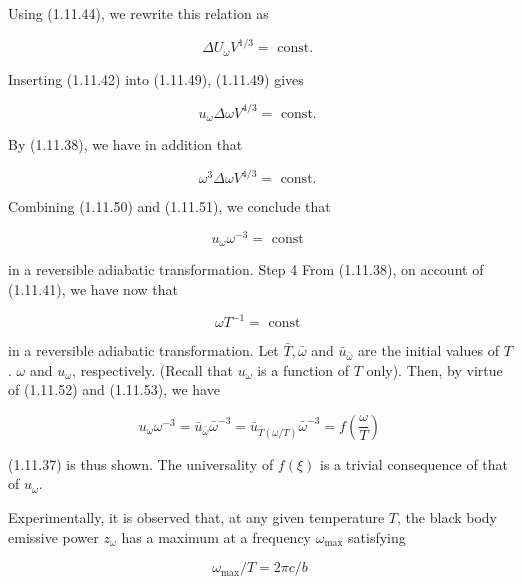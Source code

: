 \documentclass{article}
\begin{document}
Using (1.11.44), we rewrite this relation as
 
\begin{equation*}
\Delta U_{\omega} V^{1 / 3}=\text { const. } \tag{1.11.49}
\end{equation*}
 

Inserting (1.11.42) into (1.11.49), (1.11.49) gives
 
\begin{equation*}
u_{\omega} \Delta \omega V^{4 / 3}=\text { const. } \tag{1.11.50}
\end{equation*}
 

By (1.11.38), we have in addition that
 
\begin{equation*}
\omega^{3} \Delta \omega V^{4 / 3}=\text { const. } \tag{1.11.51}
\end{equation*}
 

Combining (1.11.50) and (1.11.51), we conclude that
 
\begin{equation*}
u_{\omega} \omega^{-3}=\text { const } \tag{1.11.52}
\end{equation*}
 
in a reversible adiabatic transformation.
Step 4 From (1.11.38), on account of (1.11.41), we have now that
 
\begin{equation*}
\omega T^{-1}=\text { const } \tag{1.11.53}
\end{equation*}
 
in a reversible adiabatic transformation. Let $\bar{T}, \bar{\omega}$ and $\bar{u}_{\bar{\omega}}$ are the initial values of $T$. $\omega$ and $u_{\omega}$, respectively. (Recall that $u_{\omega}$ is a function of $T$ only). Then, by virtue of (1.11.52) and (1.11.53), we have
 
\begin{equation*}
u_{\omega} \omega^{-3}=\bar{u}_{\bar{\omega}} \bar{\omega}^{-3}=\bar{u}_{\bar{T}(\omega / T)} \bar{\omega}^{-3}=f\left(\frac{\omega}{T}\right) \tag{1.11.54}
\end{equation*}
 
(1.11.37) is thus shown. The universality of $f(\xi)$ is a trivial consequence of that of $u_{\omega}$.

Experimentally, it is observed that, at any given temperature $T$, the black body emissive power $z_{\omega}$ has a maximum at a frequency $\omega_{\max }$ satisfying
 
\begin{equation*}
\omega_{\max } / T=2 \pi c / b \tag{1.11.55}
\end{equation*}
 
\end{document}
